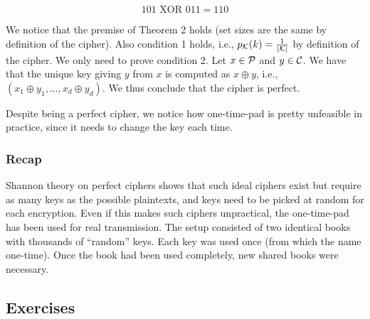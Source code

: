 $$
101 \text{ XOR } 011 = 110
$$

We notice that the premise of Theorem 2 holds (set sizes are the same by definition of the cipher). Also condition 1 holds, i.e., $p_{\cal K}(k) = \frac{1}{|{\cal K}|}$ by definition of the cipher. We only need to prove condition 2. Let $x \in {\cal P}$ and $y \in {\cal C}$. We have that the unique key giving $y$ from $x$ is computed as $x \oplus y$, i.e., $(x_1 \oplus y_1, \ldots, x_d \oplus y_d)$. We thus conclude that the cipher is perfect.

Despite being a perfect cipher, we notice how one-time-pad is pretty unfeasible in practice, since it needs to change the key each time.

\subsubsection{Recap}
Shannon theory on perfect ciphers shows that such ideal ciphers exist but require as many keys as the possible plaintexts, and keys need to be picked at random for each encryption. Even if this makes such ciphers unpractical, the one-time-pad has been used for real transmission. The setup consisted of two identical books with thousands of  “random” keys. Each key was used once (from which the name one-time). Once the book had been used completely, new shared books were necessary.

\newpage
\subsection{Exercises}

